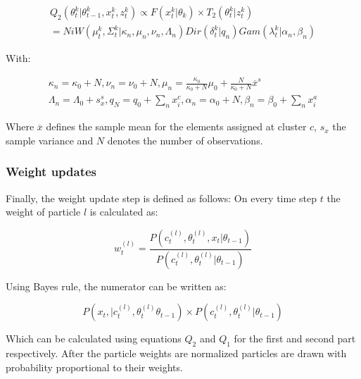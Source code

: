 \documentclass[twoside,hidelinks]{article}
\begin{document}
\begin{equation} \label{Q_2}
\begin{split}
Q_2(\theta_t^k | \theta_{t-1}^k , x_t^k, z_t^k) \propto F( x_t^k | \theta_k) \times T_2(\theta_t^k | z_t^k) \\
= NiW( \mu_t^k, \Sigma_t^k | \kappa_n, \mu_n, \nu_n, \Lambda_n ) Dir(\delta_t^k | q_n) Gam(\lambda_t^k | \alpha_n, \beta_n)
\end{split}
\end{equation}

With:

\begin{equation} \label{udpates}
\begin{split}
\kappa_n = \kappa_0 + N ,
\nu_n = \nu_0 + N ,
\mu_n = \frac{\kappa_0}{\kappa_0 + N} \mu_0 +  \frac{N}{\kappa_0 + N} \overline{x}^s\\
\Lambda_n = \Lambda_0 + s_{x}^s,
q_N = q_0 +  \sum_n x_i^c,
\alpha_n = \alpha_0 +  N,
\beta_n = \beta_0 +  \sum_n x_i^a
\end{split}
\end{equation}


Where $\overline{x}$ defines the sample mean for the elements assigned at cluster $c$, $s_{x}$ the sample variance and $N$ denotes the number of observations\cite{conjugate}.

\subsubsection{Weight updates}

Finally, the weight update step is defined as follows: On every time step $t$ the weight of particle $l$ is calculated as:

\begin{equation}
w_t^{(l)} = \frac {P(c_t^{(l)} , \theta_t^{(l)}, x_t| 	\theta_{t-1} )}{P(c_t^{(l)} , \theta_t^{(l)}| 	\theta_{t-1} )}
\end{equation}

Using Bayes rule, the numerator can be written as:

\begin{equation}
	P(x_t , | c_t^{(l)} , \theta_t^{(l)} \theta_{t-1} ) \times P(c_t^{(l)} , \theta_t^{(l)}|  \theta_{t-1} )
\end{equation}

Which can be calculated using equations $Q_2$ and $Q_1$ for the first and second part respectively. After the particle weights are normalized particles are drawn with probability proportional to their weights.
\end{document}
